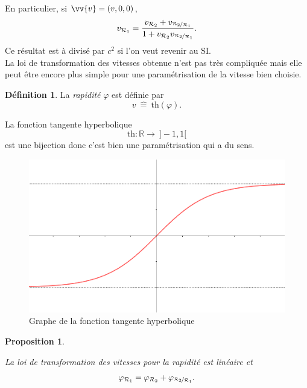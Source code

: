 \documentclass[a4paper,11pt]{report}
\theoremstyle{definition}
\theoremstyle{plain}
\newtheorem{prop}[thm]{Proposition}
\theoremstyle{definition}
\newtheorem{defn}{Définition}[chapter]
\theoremstyle{remark}
\renewcommand{\th}[1]{\text{th}(#1)}
\newcommand{\R}{\mathcal{R}}
\begin{document}
            En particulier, si $\vv{v} = (v,0,0)$, 
            \begin{equation}
                v_{\R_1}  = \frac{v_{\R_2}+v_{\nicefrac{\R_2}{\R_1}}}{1+v_{\R_2}v_{\nicefrac{\R_2}{\R_1}}}.
                \label{LTVx}
            \end{equation}
            Ce résultat est à divisé par $c^2$ si l'on veut revenir au SI.\\
            
            La loi de transformation des vitesses obtenue n'est pas très compliquée mais elle peut être encore plus simple pour une paramétrisation de la vitesse bien choisie.
            
            \begin{defn}
                La \textit{rapidité} $\varphi$ est définie par
                \begin{equation}
                    v~\hat{=}~\th{\varphi}.
                \end{equation}
            \end{defn}
            
            La fonction tangente hyperbolique 
            $$\text{th}:\mathbb{R}\to~ ]-1,1[$$ 
            est une bijection donc c'est bien une paramétrisation qui a du sens.
            
            \begin{figure}[H]
            \centering
            \includegraphics[scale = 0.4]{Tanh.PNG}
            \caption{Graphe de la fonction tangente hyperbolique}
            \end{figure}
            
            \begin{prop}\begin{leftbar}
                La loi de transformation des vitesses pour la rapidité est linéaire et 
                \begin{equation}
                    \varphi_{\R_1} = \varphi_{\R_2}+\varphi_{\nicefrac{\R_2}{\R_1}}.
                \end{equation}
            \end{leftbar}\end{prop}
            
\end{document}
